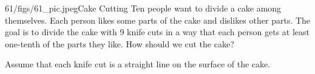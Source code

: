 \begin{problem}{61/figs/61_pic.jpeg}{Cake Cutting} Ten people want to divide a cake among themselves. Each person likes some parts of the cake and dislikes other parts. The goal is to divide the cake with 9 knife cuts in a way that each person gets at least one-tenth of the parts they like. How should we cut the cake?
	
Assume that each knife cut is a straight line on the surface of the cake.
\end{problem}